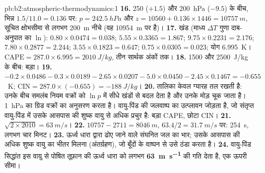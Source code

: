 \begin{solution}{pb:b2:atmospheric-thermodynamics:1}
\textbf{16.} 250 ($+1.5$) और \qty{200}{hPa} ($-9.5$) के बीच, भिन्न $1.5/11.0 =
0.136$ पर: $p = \qty{242.5}{hPa}$ और $z = 10560 + 0.136 \times 1446 = \qty{10757}{m}$, सूचित क्षोभसीमा से
लगभग \qty{200}{m} नीचे (वह \qty{10954}{m} पर है)।
\textbf{17.} खंड (माध्य $\Delta T$ गुणा दाब-अनुपात का $\ln$): $0.80 \times 0.0474
= 0.038$; $5.55 \times 0.3365 = 1.867$; $9.75 \times 0.2231 = 2.176$; $7.80 \times 0.2877 =
2.244$; $3.55 \times 0.1823 = 0.647$; $0.75 \times 0.0305 = 0.023$; योग \qty{6.995}{K}।
$\text{CAPE} = 287.0 \times 6.995 = \qty{2010}{J/kg}$, तीन सार्थक अंकों तक।
\textbf{18.} 1500 और \qty{2500}{J/kg} के बीच: बड़ा।
\textbf{19.} $-0.2 \times 0.0486 - 0.3 \times 0.0189 - 2.65 \times 0.0207 - 5.0 \times 0.0450 -
2.45 \times 0.1467 = -0.655$~\unit{K}; $\text{CIN} = 287.0 \times (-0.655) = \qty{-188}{J/kg}$।
\textbf{20.} तालिका केवल ग्यारह तल रखती है: उनके बीच समलंब नियम वक्रों को
$\ln p$ में सीधे खंडों से बदल देता है और उनके मोड़ चूक जाता है। \qty{1}{hPa} का ग्रिड वक्रों का अनुसरण करता है। 
वायु-पिंड की जलवाष्प का उत्प्लावन जोड़ता है, जो संतृप्त वायु-पिंड में उसके आसपास की
शुष्क वायु से अधिक प्रचुर है: बड़ा CAPE, छोटा CIN।
\textbf{21.} $\sqrt{2 \times 2010} = \qty{63}{m/s}$।
\textbf{22.} $10757 - 2711 = \qty{8046}{m}$, $63.4/2 = \qty{31.7}{m/s}$ पर: \qty{254}{s}, लगभग चार
मिनट।
\textbf{23.} ऊर्ध्व धारा द्वारा ढोए जाने वाले संघनित जल का भार; उसके आसपास की अधिक शुष्क वायु का
भीतर मिलना (अंतर्ग्रहण), जो बूँदों के वाष्पन से उसे ठंडा करता है।
\textbf{24.} वायु-पिंड सिद्धांत इस वायु से पोषित तूफ़ान की ऊर्ध्व धारा को लगभग
\textbf{\qty[text-series-to-math=true]{63}{m.s^{-1}}} की गति देता है, एक ऊपरी सीमा।
\end{solution}
